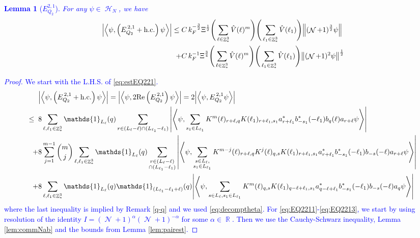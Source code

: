 \documentclass[sn-mathphys, Numbered ,a4paper]{sn-jnl}%
\DeclareMathOperator{\R}{\mathbb{R}}
\DeclareMathOperator{\Z}{\mathbb{Z}}
\DeclareMathOperator{\HH}{\mathcal{H}}
\DeclareMathOperator{\NN}{\mathcal{N}}
\newcommand{\half}{\frac{1}{2}}
\newcommand{\eva}[1]{\left\langle #1 \right\rangle}
\theoremstyle{plain}
\newtheorem{lemma}[theorem]{Lemma}
\theoremstyle{definition}
\theoremstyle{remark}
\theoremstyle{plain}
\theoremstyle{definition}
\theoremstyle{remark}
\begin{document}
\textcolor{blue}{\begin{lemma}[$E_{Q_2}^{2,1}$]
    For any $\psi \in \HH_N$, we have
    \begin{alignat}{2}
    	\abs{\eva{\psi,\left(E^{\,2,1}_{Q_2}+\mathrm{h.c.}\right) \psi }}
    	\leq \; &C\,  k_{F}^{-\frac{3}{2}} \Xi^\half \Bigg(\sum\limits_{\ell \in \Z^3_*} \hat{V}(\ell)^m\Bigg)\Bigg( \sum\limits_{\ell_1 \in \Z^3_*} \hat{V}(\ell_1) \Bigg) \norm { (\NN+1)^{\frac{3}{2}} \psi }\\
    	\;+ &C\, k_{F}^{-1}\Xi^{\frac{3}{4}} \Bigg(\sum\limits_{\ell \in \Z^3_*} \hat{V}(\ell)^m\Bigg) \Bigg(\sum\limits_{\ell_1 \in \Z^3_*} \hat{V}(\ell_1) \Bigg)  \norm{ (\NN+1)^2\psi}^\half\label{eq:estEQ221}
    \end{alignat}
\end{lemma}
\begin{proof}
 We start with the L.H.S. of \eqref{eq:estEQ221}.
 \begin{align}
 	&\abs{\eva{\psi,\left(E^{\,2,1}_{Q_2}+\mathrm{h.c.}\right) \psi }} = \abs{\eva{\psi,2\mathrm{Re}\left(E^{\,2,1}_{Q_2}\right) \psi }} = 2\abs{\eva{\psi, E^{\,2,1}_{Q_2} \psi }}\nonumber\\
 	\leq\;\;&8 \sum\limits_{\ell, \ell_1\in \Z^3_*} \mathds{1}_{L_{\ell}}(q) \sum\limits_{r\in (L_{\ell}-\ell) \cap (L_{\ell_1}-\ell_1)} \abs{\eva{\psi, \sum\limits_{ s_1\in L_{\ell_1} }  K^m(\ell )_{r+\ell,q}K(\ell_1)_{r+\ell_1,s_1}
 			a^*_{r+\ell_1} b^*_{-s_1}(-\ell_1)  b_{q}(\ell)a_{r+\ell} \psi}} \label{eq:EQ2211}\\
 	\;+&8 \sum\limits_{j=1}^{m-1} {{m}\choose j} \sum\limits_{\ell, \ell_1\in \Z^3_*}\mathds{1}_{L_{\ell}}(q) \sum\limits_{\substack{r\in (L_{\ell}-\ell) \\ \cap (L_{\ell_1}-\ell_1)}}  \abs{\eva{\psi, \sum\limits_{ \substack{s \in L_{\ell},\\s_1\in L_{\ell_1}} }   K^{m-j}(\ell)_{r+\ell,q} K^{j}(\ell)_{q,s} K(\ell_1)_{r+\ell_1,s_1} a^*_{r+\ell_1}  b^*_{-s_1}(-\ell_1) b_{-s}(-\ell) a_{r+\ell} \psi }} \label{eq:EQ2212}\\
 	\;+&8\sum\limits_{\ell, \ell_1\in \Z^3_*} \mathds{1}_{L_{\ell}}(q) \mathds{1}_{(L_{\ell_1}-\ell_1+\ell)}(q)  \abs{\eva{\psi, \sum\limits_{s \in L_{\ell},s_1\in L_{\ell_1}} K^m(\ell)_{q,s} K(\ell_1)_{q-\ell+\ell_1,s_1} a^*_{q-\ell+\ell_1} b^*_{-s_1}(-\ell_1) b_{-s}(-\ell) a_{q} \psi}} \label{eq:EQ2213}
 \end{align}
 where the last inequality is implied by Remark \ref{q-q} and we used \eqref{eq:decomptheta}.
 For \eqref{eq:EQ2211}-\eqref{eq:EQ2213}, we start by using resolution of the identity $I = (\NN+1)^{\alpha}(\NN+1)^{-\alpha}$ for some $\alpha \in \R$. Then we use the Cauchy-Schwarz inequality, Lemma \ref{lem:commNab} and the bounds from Lemma \ref{lem:pairest}.

\end{proof}}
\end{document}
